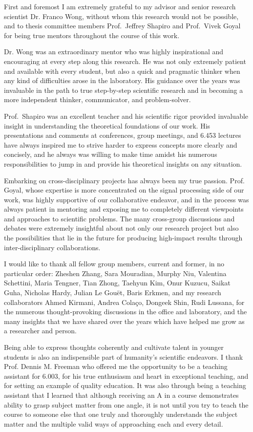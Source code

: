 First and foremost I am extremely grateful to my advisor and senior research scientist Dr. Franco Wong, without whom this research would not be possible, and to thesis committee members Prof.\ Jeffrey Shapiro and Prof.\ Vivek Goyal for being true mentors throughout the course of this work.

Dr. Wong was an extraordinary mentor who was highly inspirational and encouraging at every step along this research. He was not only extremely patient and available with every student, but also a quick and pragmatic thinker when any kind of difficulties arose in the laboratory. His guidance over the years was invaluable in the path to true step-by-step scientific research and in becoming a more independent thinker, communicator, and problem-solver.

Prof.\ Shapiro was an excellent teacher and his scientific rigor provided invaluable insight in understanding the theoretical foundations of our work. His presentations and comments at conferences, group meetings, and 6.453 lectures have always inspired me to strive harder to express concepts more clearly and concisely, and he always was willing to make time amidst his numerous responsibilities to jump in and provide his theoretical insights on any situation.

Embarking on cross-disciplinary projects has always been my true passion. Prof. Goyal, whose expertise is more concentrated on the signal processing side of our work, was highly supportive of our collaborative endeavor, and in the process was always patient in mentoring and exposing me to completely different viewpoints and approaches to scientific problems. The many cross-group discussions and debates were extremely insightful about not only our research project but also the possibilities that lie in the future for producing high-impact results through inter-disciplinary collaborations.

I would like to thank all fellow group members, current and former, in no particular order: Zheshen Zhang, Sara Mouradian, Murphy Niu, Valentina Schettini, Maria Tengner, Tian Zhong, Taehyun Kim, Onur Kuzucu, Saikat Guha, Nicholas Hardy, Julian Le Gou\"{e}t, Baris Erkmen, and my research collaborators Ahmed Kirmani, Andrea Cola\c{c}o, Dongeek Shin, Rudi Lussana, for the numerous thought-provoking discussions in the office and laboratory, and the many insights that we have shared over the years which have helped me grow as a researcher and person.

Being able to express thoughts coherently and cultivate talent in younger students is also an indispensible part of humanity's scientific endeavors. I thank Prof. Dennis M. Freeman who offered me the opportunity to be a teaching assistant for 6.003, for his true enthusiasm and heart in exceptional teaching, and for setting an example of quality education. It was also through being a teaching assistant that I learned that although receiving an A in a course demonstrates ability to grasp subject matter from one angle, it is not until you try to teach the course to someone else that one truly and thoroughly understands the subject matter and the multiple valid ways of approaching each and every detail.

